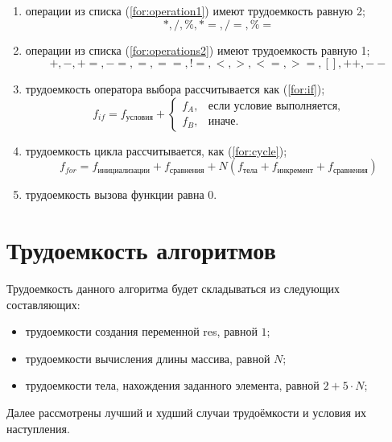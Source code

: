 \begin{enumerate}
	\item операции из списка (\ref{for:operation1}) имеют трудоемкость равную 2;
	\begin{equation}
		\label{for:operation1}
		*, /, \%, *=, /=, \%=
	\end{equation}
	\item операции из списка (\ref{for:operations2}) имеют трудоемкость равную 1;
	\begin{equation}
		\label{for:operations2}
		+, -, +=, -=, =, ==, !=, <, >, <=, >=, [], ++, {-}-
	\end{equation}
	\item трудоемкость оператора выбора  рассчитывается как (\ref{for:if});
	\begin{equation}
		\label{for:if}
		f_{if} = f_{\text{условия}} +
		\begin{cases}
			f_A, & \text{если условие выполняется,}\\
			f_B, & \text{иначе.}
		\end{cases}
	\end{equation}
	\item трудоемкость цикла рассчитывается, как (\ref{for:cycle});
	\begin{equation}
		\label{for:cycle}
		f_{for} = f_{\text{инициализации}} + f_{\text{сравнения}} + N(f_{\text{тела}} + f_{\text{инкремент}} + f_{\text{сравнения}})
	\end{equation}
	\item трудоемкость вызова функции равна 0.
\end{enumerate}
\clearpage
\section{Трудоемкость алгоритмов}

Трудоемкость данного алгоритма будет складываться из следующих составляющих:

\begin{itemize}[label=---]
	\item трудоемкости создания переменной res, равной $1$;
	\item трудоемкости вычисления длины массива, равной $N$;
	\item трудоемкости тела, нахождения заданного элемента, равной $2 + 5 \cdot N$;
\end{itemize}

Далее рассмотрены лучший и худший случаи трудоёмкости и условия их наступления.

